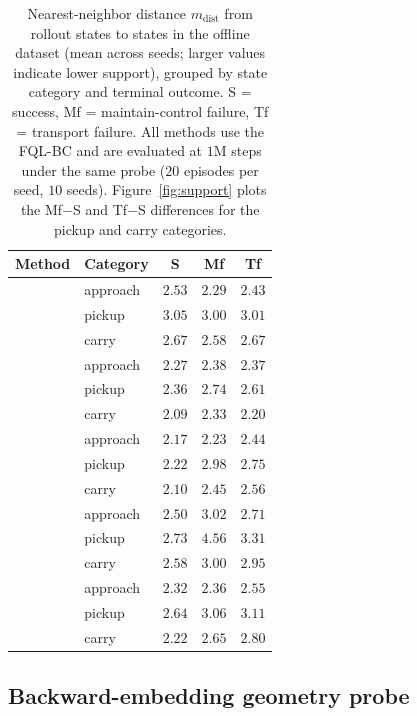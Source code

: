 \begin{table}[H]
\centering
\caption{Nearest-neighbor distance $m_{\mathrm{dist}}$ from rollout states to states in the offline dataset (mean across seeds; larger values indicate lower support), grouped by state category and terminal outcome. 
S = success, Mf = maintain-control failure, Tf = transport failure. All methods use the FQL-BC and are evaluated at $1$M steps under the same probe ($20$ episodes per seed, $10$ seeds). 
Figure~\ref{fig:support} plots the Mf$-$S and Tf$-$S differences for the pickup and carry categories.}
\label{tab:state_coverage}
\begin{tabular}{llccc}
\toprule
\textbf{Method} & \textbf{Category} & \textbf{S} & \textbf{Mf} & \textbf{Tf} \\
\midrule
\gciql{} & approach & $2.53$ & $2.29$ & $2.43$ \\
         & pickup   & $3.05$ & $3.00$ & $3.01$ \\
         & carry    & $2.67$ & $2.58$ & $2.67$ \\
\addlinespace
\fb{}    & approach & $2.27$ & $2.38$ & $2.37$ \\
         & pickup   & $2.36$ & $2.74$ & $2.61$ \\
         & carry    & $2.09$ & $2.33$ & $2.20$ \\
\addlinespace
\psm{}   & approach & $2.17$ & $2.23$ & $2.44$ \\
         & pickup   & $2.22$ & $2.98$ & $2.75$ \\
         & carry    & $2.10$ & $2.45$ & $2.56$ \\
\addlinespace
\crl{}   & approach & $2.50$ & $3.02$ & $2.71$ \\
         & pickup   & $2.73$ & $4.56$ & $3.31$ \\
         & carry    & $2.58$ & $3.00$ & $2.95$ \\
\addlinespace
\rldp{}  & approach & $2.32$ & $2.36$ & $2.55$ \\
         & pickup   & $2.64$ & $3.06$ & $3.11$ \\
         & carry    & $2.22$ & $2.65$ & $2.80$ \\
\bottomrule
\end{tabular}
\end{table}

\subsection{Backward-embedding geometry probe}
\label{app:geometry_probe}

